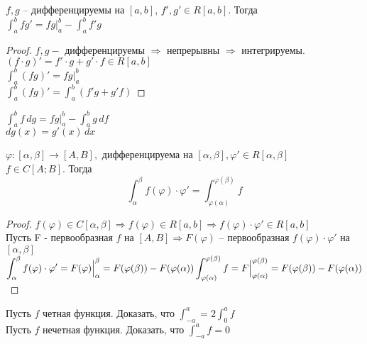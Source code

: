 \begin{Thm} 
	$f, g$ -- дифференцируемы на $[a,b]$, $f', g' \in R[a,b]$. Тогда\\
	$\displaystyle \int_{a}^{b} fg' = fg \Big|_a^b - \int_{a}^{b} f'g$
\end{Thm} 

\begin{proof}
	$f, g -$ дифференцируемы $\Rightarrow$ непрерывны $\Rightarrow$ интегрируемы.\\
	$(f \cdot g)' = f' \cdot g + g' \cdot f \in R[a,b]$\\
	$\displaystyle \int_{a}^{b} (fg)' = fg \Big|_a^b$\\
	$\displaystyle \int_a^b (fg)' = \int_{a}^{b} (f'g + g'f)$
\end{proof}

\begin{Rem}
	$\displaystyle \int_{a}^{b} f \,dg = fg \Big|_a^b - \int_{a}^{b} g \,df$\\
	$dg(x) = g'(x)\,dx$
\end{Rem}

\begin{Thm}
	$\varphi: [\alpha, \beta] \to [A,B],$ дифференцируема на $[\alpha, \beta], \varphi' \in R[\alpha, \beta]$\\
	$f \in C[A; B].$ Тогда
	\[\int_{\alpha}^{\beta} f(\varphi) \cdot \varphi' = \int_{\varphi (\alpha)}^{\varphi (\beta)} f\]
\end{Thm} 

\begin{proof}
	$f(\varphi) \in C[\alpha, \beta] \Rightarrow f(\varphi) \in R[a,b] \Rightarrow f(\varphi) \cdot \varphi' \in R[a,b]$\\
	Пусть F - первообразная $f$ на $[A,B] \Rightarrow F(\varphi)$ -- первообразная $f(\varphi) \cdot \varphi'$ на $[\alpha, \beta]$\\
	$\displaystyle \int_{\alpha}^{\beta} f(\varphi) \cdot \varphi' = F(\varphi) \Big|_{\alpha}^{\beta} = 
	F(\varphi(\beta)) - F(\varphi(\alpha))\\
	\int_{\varphi(\alpha)}^{\varphi(\beta)} f = F \Big|^{\varphi(\beta)}_{\varphi(\alpha)} = F(\varphi(\beta))
	- F(\varphi(\alpha))$
\end{proof}

\begin{Ex}
	Пусть $f$ четная функция. Доказать, что $\displaystyle \int_{-a}^{a} = 2 \int_{0}^{a} f$\\
	Пусть $f$ нечетная функция. Доказать, что $\displaystyle \int_{-a}^{a} f = 0$
\end{Ex}

